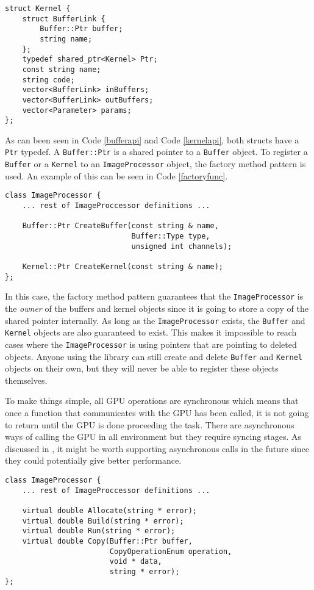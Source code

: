 \renewcommand{\lstlistingname}{Code}
\begin{lstlisting}[caption= Kernel struct, label=kernelapi]
struct Kernel {
    struct BufferLink {
        Buffer::Ptr buffer;
        string name;
    };
    typedef shared_ptr<Kernel> Ptr;
    const string name;
    string code;
    vector<BufferLink> inBuffers;
    vector<BufferLink> outBuffers;
    vector<Parameter> params;
};
\end{lstlisting}

As can been seen in Code \ref{bufferapi} and Code \ref{kernelapi}, both structs have a {\tt Ptr} typedef. A {\tt Buffer::Ptr} is a shared pointer\cite{smartpointer} to a {\tt Buffer} object. To register a {\tt Buffer} or a {\tt Kernel} to an {\tt ImageProcessor} object, the factory method pattern\cite{designpatterns} is used. An example of this can be seen in Code \ref{factoryfunc}.
\newline
\renewcommand{\lstlistingname}{Code}
\begin{lstlisting}[caption= Factory functions to create Buffer and Kernel objects, label=factoryfunc]
class ImageProcessor {
    ... rest of ImageProccessor definitions ...

    Buffer::Ptr CreateBuffer(const string & name,
                             Buffer::Type type,
                             unsigned int channels);

    Kernel::Ptr CreateKernel(const string & name);
};
\end{lstlisting}
In this case, the factory method pattern guarantees that the {\tt ImageProcessor} is the \emph{owner} of the buffers and kernel objects since it is going to store a copy of the shared pointer internally. As long as the {\tt ImageProcessor} exists, the {\tt Buffer} and {\tt Kernel} objects are also guaranteed to exist. This makes it impossible to reach cases where the {\tt ImageProcessor} is using pointers that are pointing to deleted objects. Anyone using the library can still create and delete {\tt Buffer} and {\tt Kernel} objects on their own, but they will never be able to register these objects themselves.

To make things simple, all GPU operations are synchronous which means that once a function that communicates with the GPU has been called, it is not going to return until the GPU is done proceeding the task. There are asynchronous ways of calling the GPU in all environment but they require syncing stages. As discussed in \cite{cudaoptimize}, it might be worth supporting asynchronous calls in the future since they could potentially give better performance.
\newline
\renewcommand{\lstlistingname}{Code}
\begin{lstlisting}[caption= {\tt ImageProcessor} API for GPU operations, label=ipapi]
class ImageProcessor {
    ... rest of ImageProccessor definitions ...

    virtual double Allocate(string * error);
    virtual double Build(string * error);
    virtual double Run(string * error);
    virtual double Copy(Buffer::Ptr buffer,
                        CopyOperationEnum operation,
                        void * data,
                        string * error);
};
\end{lstlisting}

